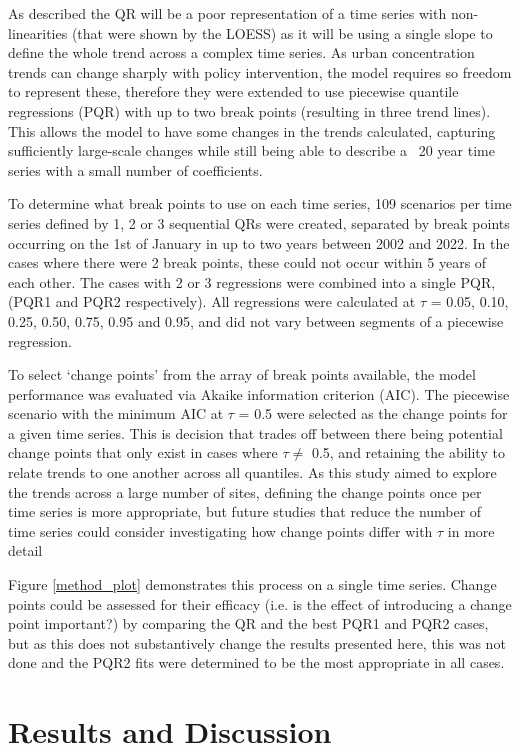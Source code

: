 \documentclass[journal abbreviation, manuscript]{copernicus}
\begin{document}
As described the QR will be a poor representation of a time series with non-linearities (that were shown by the LOESS) as it will be using a single slope to define the whole trend across a complex time series. As urban concentration trends can change sharply with policy intervention, the model requires so freedom to represent these, therefore they were extended to use piecewise quantile regressions (PQR) with up to two break points (resulting in three trend lines). This allows the model to have some changes in the trends calculated, capturing sufficiently large-scale changes while still being able to describe a ~20 year time series with a small number of coefficients.

To determine what break points to use on each time series, 109 scenarios per time series defined by 1, 2 or 3 sequential QRs were created, separated by break points occurring on the 1st of January in up to two years between 2002 and 2022. In the cases where there were 2 break points, these could not occur within 5 years of each other. The cases with 2 or 3 regressions were combined into a single PQR, (PQR1 and PQR2 respectively). All regressions were calculated at $\tau$ = 0.05, 0.10, 0.25, 0.50, 0.75, 0.95 and 0.95, and did not vary between segments of a piecewise regression.

To select ‘change points’ from the array of break points available, the model performance was evaluated via Akaike information criterion (AIC). The piecewise scenario with the minimum AIC at $\tau$ = 0.5 were selected as the change points for a given time series. This is decision that  trades off between there being potential change points that only exist in cases where $\tau \neq$ 0.5, and retaining the ability to relate trends to one another across all quantiles. As this study aimed to explore the trends across a large number of sites, defining the change points once per time series is more appropriate, but future studies that reduce the number of time series could consider investigating how change points differ with $\tau$ in more detail

Figure \ref{method_plot} demonstrates this process on a single time series. Change points could be assessed for their efficacy (i.e. is the effect of introducing a change point important?) by comparing the QR and the best PQR1 and PQR2 cases, but as this does not substantively change the results presented here, this was not done and the PQR2 fits were determined to be the most appropriate in all cases.

\clearpage
\section{Results and Discussion}
\end{document}
